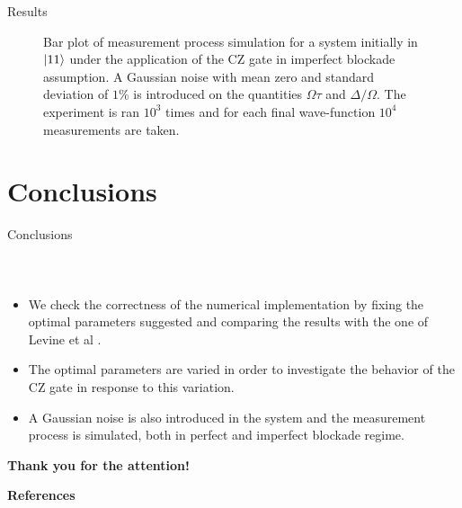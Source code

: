 \documentclass[8pt]{beamer}
\begin{document}
\begin{frame}{Results}
\begin{figure}[H]
\begin{minipage}[]{0.49\linewidth}
        \end{minipage}
        \caption{Bar plot of measurement process simulation for a system initially in $\ket{11}$ under the application of the CZ gate in imperfect blockade assumption. A Gaussian noise with mean zero and standard deviation of $1\%$ is introduced on the quantities $\Omega\tau$ and $\Delta/\Omega$. The experiment is ran $10^3$ times and for each final wave-function $10^4$ measurements are taken.}
        \label{fig:measurement_imperfect-blockade}
        \end{figure}	
	
	\end{frame}
	
	\section{Conclusions}
	
 	\begin{frame}{Conclusions}
	\framesubtitle{~}  
	
	\begin{itemize}
	    \item We check the correctness of the numerical implementation by fixing the optimal parameters suggested and comparing the results with the one of Levine et al \cite{PhysRevLett.123.170503}.
	    
	    \medskip
	    
	    \item The optimal parameters are varied in order to investigate the behavior of the CZ gate in response to this variation.
	    
	    \medskip
	    
	    \item A Gaussian noise is also introduced in the system and the measurement process is simulated, both in perfect and imperfect blockade regime.
	\end{itemize}
	
	\pause 
	
	\bigskip

        \begin{center}
            \begin{minipage}[c]{0.55\textwidth}
                \begin{tcolorbox}[colframe=mydarkblue,colback=myblue,coltext=black]
                    \begin{center}
                        \Huge \textbf{Thank you for the attention!}
                    \end{center}
                \end{tcolorbox}
            \end{minipage}
        \end{center}
        
    \color{myred}\textbf{References}
    
    {}
        
	\end{frame}	



	
 
\end{document}
